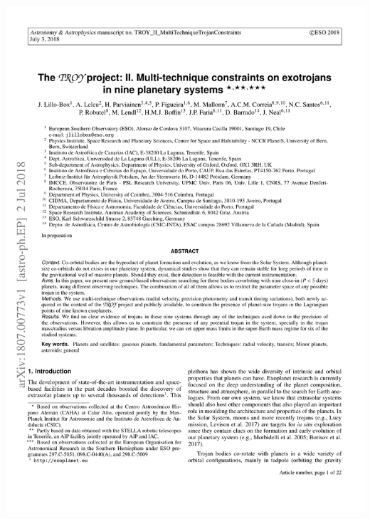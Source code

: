 {%
    {\includegraphics[width=.9\textwidth, keepaspectratio=true, page = 1, trim = 1.3cm 1cm 1.3cm 1cm, clip = true]{appendices/papers/Lillo-Box2018_grey.pdf}}

}
